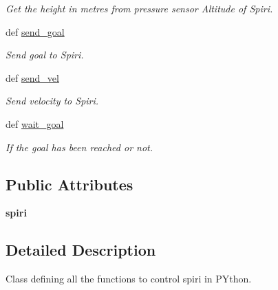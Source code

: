 \begin{DoxyCompactItemize}
\begin{DoxyCompactList}\small\item\em \-Get the height in metres from pressure sensor \-Altitude of \-Spiri. \end{DoxyCompactList}\item 
def \hyperlink{classspiri__api_1_1api_1_1spiri__api__python_ac0682f217e047de2105fa5197c5390e9}{send\-\_\-goal}
\begin{DoxyCompactList}\small\item\em \-Send goal to \-Spiri. \end{DoxyCompactList}\item 
def \hyperlink{classspiri__api_1_1api_1_1spiri__api__python_a859017d8702ed2ca9e054ee56467deaa}{send\-\_\-vel}
\begin{DoxyCompactList}\small\item\em \-Send velocity to \-Spiri. \end{DoxyCompactList}\item 
def \hyperlink{classspiri__api_1_1api_1_1spiri__api__python_aab36295662834a6e9c4e95d2fc3d1d7c}{wait\-\_\-goal}
\begin{DoxyCompactList}\small\item\em \-If the goal has been reached or not. \end{DoxyCompactList}\end{DoxyCompactItemize}
\subsection*{\-Public \-Attributes}
\begin{DoxyCompactItemize}
\item 
\hypertarget{classspiri__api_1_1api_1_1spiri__api__python_a94b9a7c31882ffc8f767a6c927f247ca}{{\bfseries spiri}}\label{classspiri__api_1_1api_1_1spiri__api__python_a94b9a7c31882ffc8f767a6c927f247ca}

\end{DoxyCompactItemize}


\subsection{\-Detailed \-Description}
\-Class defining all the functions to control spiri in \-P\-Ython. 

